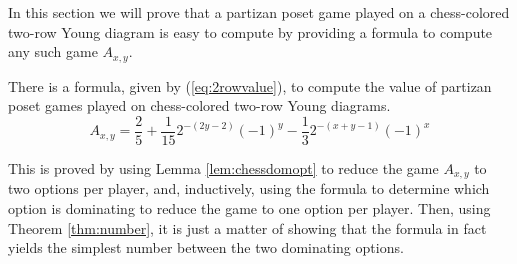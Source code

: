 In this section we will prove that a partizan poset game played on a chess-colored two-row Young diagram is easy to compute by providing a formula to compute any such game $A_{x,y}$.
\begin{thm}
\label{thm:2rowvalue}
There is a formula, given by (\ref{eq:2rowvalue}), to compute the value of partizan poset games played on chess-colored two-row Young diagrams.
\begin{equation}
\label{eq:2rowvalue}
A_{x,y}=
\frac{2}{5}+\frac{1}{15}2^{-(2y-2)}(-1)^y-\frac{1}{3}2^{-(x+y-1)}(-1)^x
\end{equation}
\end{thm}
This is proved by using Lemma \ref{lem:chessdomopt} to reduce the game $A_{x,y}$ to two options per player, and, inductively, using the formula to determine which option is dominating to reduce the game to one option per player. Then, using Theorem \ref{thm:number}, it is just a matter of showing that the formula in fact yields the simplest number between the two dominating options.
